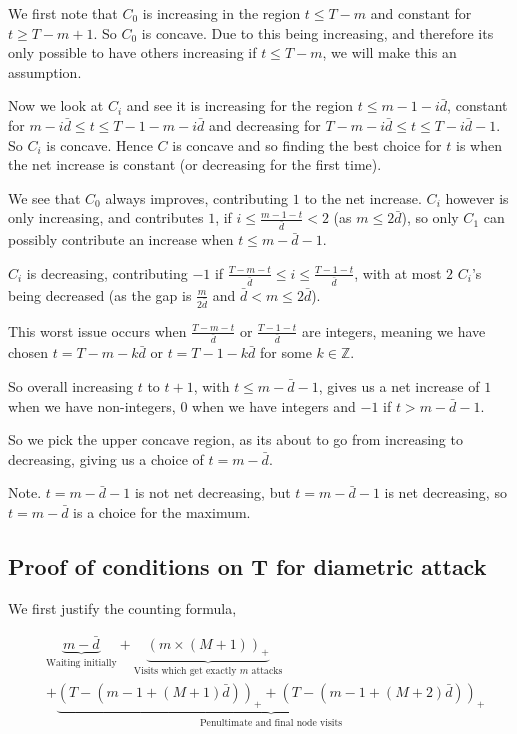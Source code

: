 \documentclass[a4paper,10pt]{article}
\newcommand{\pospart}[1]{\left( #1 \right)_{+}}
\theoremstyle{definition}
\theoremstyle{definition}
\theoremstyle{remark}
\theoremstyle{definition}
\begin{document}
We first note that $C_{0}$ is increasing in the region $t \leq T-m$ and constant for $t \geq T-m+1$. So $C_{0}$ is concave. Due to this being increasing, and therefore its only possible to have others increasing if $t \leq T-m$, we will make this an assumption.

Now we look at $C_{i}$ and see it is increasing for the region $t \leq m-1-i\bar{d}$, constant for $m-i\bar{d} \leq t \leq T-1-m-i \bar{d}$ and decreasing for $ T-m-i \bar{d} \leq t \leq T-i \bar{d}-1$. So $C_{i}$ is concave. Hence $C$ is concave and so finding the best choice for $t$ is when the net increase is constant (or decreasing for the first time).

We see that $C_{0}$ always improves, contributing $1$ to the net increase. $C_{i}$ however is only increasing, and contributes $1$, if $i \leq \frac{m-1-t}{\bar{d}} < 2$ (as $m \leq 2\bar{d}$), so only $C_{1}$ can possibly contribute an increase when $t \leq m-\bar{d}-1$.

$C_{i}$ is decreasing, contributing $-1$ if $\frac{T-m-t}{\bar{d}} \leq i \leq \frac{T-1-t}{\bar{d}}$, with at most $2$ $C_{i}$'s being decreased (as the gap is $\frac{m}{2 \bar{d}}$ and $\bar{d} < m \leq 2 \bar{d}$).

This worst issue occurs when $\frac{T-m-t}{\bar{d}}$ or $\frac{T-1-t}{\bar{d}}$ are integers, meaning we have chosen $t=T-m-k\bar{d}$ or $t=T-1-k\bar{d}$ for some $k \in \mathbb{Z}$.

So overall increasing $t$ to $t+1$, with $t \leq m-\bar{d}-1$, gives us a net increase of $1$ when we have non-integers, $0$ when we have integers  and $-1$ if $t > m- \bar{d}-1$.

So we pick the upper concave region, as its about to go from increasing to decreasing, giving us a choice of $t=m-\bar{d}$.
 
Note. $t=m-\bar{d}-1$ is not net decreasing, but $t=m-\bar{d}-1$ is net decreasing, so $t=m-\bar{d}$ is a choice for the maximum.

\subsection{Proof of conditions on T for diametric attack}
\label{Appendix:Proof of conditions on T for diametric attack}

We first justify the counting formula,

\begin{align*}
&\underbrace{m-\bar{d}}_{\text{Waiting initially}} + \underbrace{\pospart{m \times \left( M +1 \right)}}_{\text{Visits which get exactly } m \text{ attacks}} \\
&+ \underbrace{\pospart{T- \left( m-1 + \left(M +1 \right) \bar{d} \right)}+\pospart{T- \left( m-1 + \left(M +2 \right) \bar{d} \right)}}_{\text{Penultimate and final node visits}} 
\end{align*}
\end{document}
